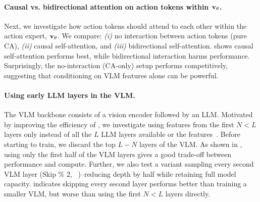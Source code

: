 

\paragraph{Causal vs. bidirectional attention on action tokens within \( \mathbf{v}_\theta \).} 
Next, we investigate how action tokens should attend to each other within the action expert, \( \mathbf{v}_\theta \). 
We compare: \emph{(i)} no interaction between action tokens (pure CA), \emph{(ii)} causal self-attention, and \emph{(iii)} bidirectional self-attention.  shows causal self-attention performs best, while bidirectional interaction harms performance.
Surprisingly, the no-interaction (CA-only) setup performs competitively, suggesting that conditioning on VLM features alone can be powerful.

\paragraph{Using early LLM layers in the VLM.}
The VLM backbone consists of a vision encoder followed by an LLM. 
Motivated by improving the efficiency of \ours, we investigate using features from the first \( N < L\) layers only instead of all the \( L \) LLM layers available or the features~\citep{black2024pi_0}.
Before starting to train, we discard the top \( L - N \) layers of the VLM. 
As shown in , using only the first half of the VLM layers gives a good trade-off between performance and compute. 
Further, we also test a variant sampling every second VLM layer (Skip \% 2, ~\citep{shukor2024skipping})--reducing depth by half while retaining full model capacity.  indicates skipping every second layer performs better than training a smaller VLM, but worse than using the first \( N < L \) layers directly.




